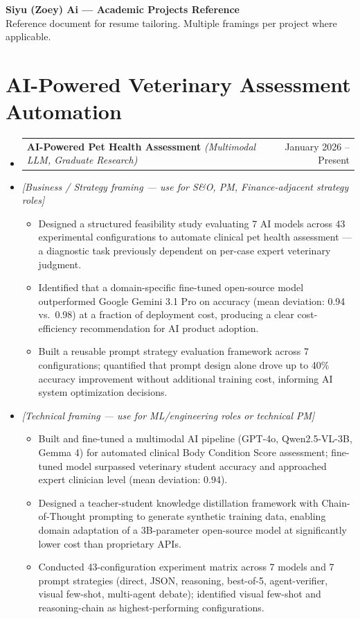 \documentclass[letterpaper,10pt]{article}
\makeatletter
\newcommand{\resumeItem}[1]{\item\small{{#1\vspace{-2pt}}}}
\newcommand{\resumeProjectHeading}[2]{
  \item\begin{tabular*}{0.97\textwidth}{l@{\extracolsep{\fill}}r}
    \small#1 & #2 \\
  \end{tabular*}\vspace{-7pt}}
\newcommand{\resumeNote}[1]{\item\small{\textit{[#1]}}\vspace{-4pt}}
\newcommand{\resumeSubHeadingListStart}{\begin{itemize}[leftmargin=0.15in,label={}]}
\newcommand{\resumeSubHeadingListEnd}{\end{itemize}}
\newcommand{\resumeItemListStart}{\begin{itemize}}
\newcommand{\resumeItemListEnd}{\end{itemize}\vspace{-5pt}}
\makeatother
\begin{document}
\begin{center}
  {\LARGE \textbf{Siyu (Zoey) Ai --- Academic Projects Reference}} \\[4pt]
  \small Reference document for resume tailoring. Multiple framings per project where applicable.
\end{center}

\section{AI-Powered Veterinary Assessment Automation}
\resumeSubHeadingListStart
  \resumeProjectHeading{\textbf{AI-Powered Pet Health Assessment} \emph{(Multimodal LLM, Graduate Research)}}{January 2026 -- Present}

  \resumeNote{Business / Strategy framing — use for S\&O, PM, Finance-adjacent strategy roles}
  \resumeItemListStart
    \resumeItem{Designed a structured feasibility study evaluating 7 AI models across 43 experimental configurations to automate clinical pet health assessment --- a diagnostic task previously dependent on per-case expert veterinary judgment.}
    \resumeItem{Identified that a domain-specific fine-tuned open-source model outperformed Google Gemini 3.1 Pro on accuracy (mean deviation: 0.94 vs.\ 0.98) at a fraction of deployment cost, producing a clear cost-efficiency recommendation for AI product adoption.}
    \resumeItem{Built a reusable prompt strategy evaluation framework across 7 configurations; quantified that prompt design alone drove up to 40\% accuracy improvement without additional training cost, informing AI system optimization decisions.}
  \resumeItemListEnd

  \resumeNote{Technical framing --- use for ML/engineering roles or technical PM}
  \resumeItemListStart
    \resumeItem{Built and fine-tuned a multimodal AI pipeline (GPT-4o, Qwen2.5-VL-3B, Gemma 4) for automated clinical Body Condition Score assessment; fine-tuned model surpassed veterinary student accuracy and approached expert clinician level (mean deviation: 0.94).}
    \resumeItem{Designed a teacher-student knowledge distillation framework with Chain-of-Thought prompting to generate synthetic training data, enabling domain adaptation of a 3B-parameter open-source model at significantly lower cost than proprietary APIs.}
    \resumeItem{Conducted 43-configuration experiment matrix across 7 models and 7 prompt strategies (direct, JSON, reasoning, best-of-5, agent-verifier, visual few-shot, multi-agent debate); identified visual few-shot and reasoning-chain as highest-performing configurations.}
  \resumeItemListEnd
\resumeSubHeadingListEnd
\end{document}
